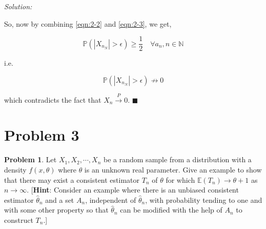 \documentclass[12pt]{article}
\newcommand{\N}{\mathbb{N}}
\newcommand{\E}{\mathbb{E}}
\newcommand{\prob}{\mathbb{P}}
\theoremstyle{definition}
\newtheorem*{prb}{Problem}
\newenvironment{problem}{\begin{tcolorbox}[colback=blue!5!white,colframe=blue!75!black, parbox = true] \begin{prb}  }{\end{prb}\end{tcolorbox} }
\newenvironment{answer}{\textit{Solution: }\quad }{ \hfill $\blacksquare$}
\numberwithin{equation}{section}
\begin{document}
\begin{answer}
\begin{enumerate}
\end{enumerate}

So, now by combining \cref{eqn:2-2} and \cref{eqn:2-3}, we get,

$$\prob\left( |X_{n_N}|>\epsilon\right)\geq \dfrac{1}{2} \quad \forall a_n, n \in \N$$

i.e. 

$$\prob\left( |X_{n_N}|>\epsilon\right) \not\rightarrow 0$$

which contradicts the fact that $X_n \xrightarrow{P} 0$.
\end{answer}

\pagebreak
\section{Problem 3}

\begin{problem}
 Let $X_1,X_2,\cdots,X_n$ be a random sample from a distribution with a density $f(x, \theta)$ where $\theta$ is an unknown real parameter. Give an example to show that there may exist a consistent estimator $T_n$ of $\theta$ for which $\E(T_n) \rightarrow\theta + 1$ as $n\rightarrow\infty$. [\textbf{Hint}: Consider an example where there is an unbiased consistent estimator $\hat{\theta}_n$ and a set $A_n$, independent of $\hat{\theta}_n$, with probability tending to one and with some other property so that $\hat{\theta}_n$ can be modified with the help of $A_n$ to construct $T_n$.]
\end{problem}
\end{document}
